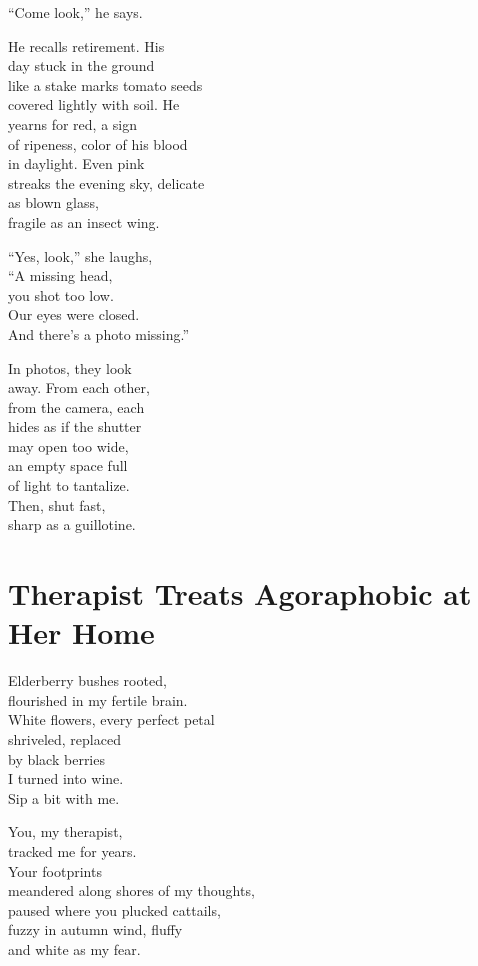 \documentclass[twoside,10pt]{book}
\begin{document}
``Come look,'' he says.

He recalls retirement. His\\
day stuck in the ground\\
like a stake marks tomato seeds\\
covered lightly with soil. He\\
yearns for red, a sign\\
of ripeness, color of his blood\\
in daylight. Even pink\\
streaks the evening sky, delicate\\
as blown glass,\\
fragile as an insect wing.

``Yes, look,'' she laughs,\\
``A missing head,\\
you shot too low.\\
Our eyes were closed.\\
And there's a photo missing.''

In photos, they look\\
away. From each other,\\
from the camera, each\\
hides as if the shutter\\
may open too wide,\\
an empty space full\\
of light to tantalize.\\
Then, shut fast,\\
sharp as a guillotine.


\clearpage
\section{Therapist Treats Agoraphobic at Her Home}

Elderberry bushes rooted,\\
flourished in my fertile brain.\\
White flowers, every perfect petal\\
shriveled, replaced\\
by black berries\\
I turned into wine.\\
Sip a bit with me.

You, my therapist,\\
tracked me for years.\\
Your footprints\\
meandered along shores of my thoughts,\\
paused where you plucked cattails,\\
fuzzy in autumn wind, fluffy\\
and white as my fear.
\end{document}
